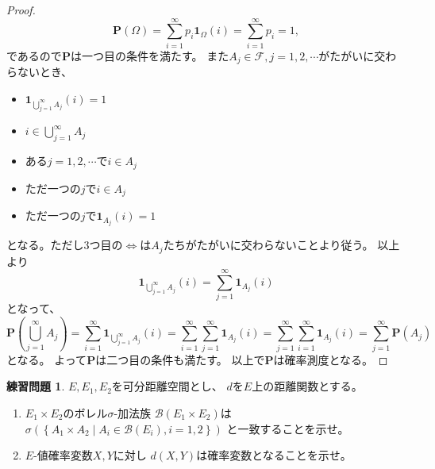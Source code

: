 \documentclass[uplatex]{jsarticle}
\theoremstyle{definition}
\newtheorem{prob}[prob]{練習問題}
\def\P{\mathbf{P}}
\def\I{\mathbf{1}}
\def\mcB{\mathcal{B}}
\def\mcF{\mathcal{F}}
\begin{document}
\begin{proof}
  \[
  \P(\Omega) = \sum_{i=1}^\infty p_i\I_{\Omega}(i) = \sum_{i=1}^\infty p_i = 1,
  \]
  であるので\(\P\)は一つ目の条件を満たす。
  また\(A_j\in\mcF, j = 1,2,\cdots \)がたがいに交わらないとき、
  \begin{itemize}
    \item[ \ ]
    \(\I_{\bigcup_{j=1}^\infty A_j}(i) = 1\)
    \item[\(\iff\)]
    \(i\in \bigcup_{j=1}^\infty A_j\)
    \item[\(\iff\)]
    ある\(j=1,2,\cdots\)で\(i\in A_j\)
    \item[\(\iff\)]
    ただ一つの\(j\)で\(i\in A_j\)
    \item[\(\iff\)]
    ただ一つの\(j\)で\(\I_{A_j}(i)=1\)
  \end{itemize}
  となる。ただし3つ目の\(\iff\)は\(A_j\)たちがたがいに交わらないことより従う。
  以上より
  \[
  \I_{\bigcup_{j=1}^\infty A_j}(i) = \sum_{j=1}^\infty \I_{A_j}(i)
  \]
  となって、
  \[
  \P(\bigcup_{j=1}^\infty A_j)
  = \sum_{i=1}^\infty \I_{\bigcup_{j=1}^\infty A_j}(i)
  = \sum_{i=1}^\infty \sum_{j=1}^\infty \I_{A_j}(i)
  = \sum_{j=1}^\infty \sum_{i=1}^\infty \I_{A_j}(i)
  = \sum_{j=1}^\infty \P(A_j)
  \]
  となる。
  よって\(\P\)は二つ目の条件も満たす。
  以上で\(\P\)は確率測度となる。
\end{proof}






\begin{prob}\label{prob: 1.3}
  \(E,E_1,E_2\)を可分距離空間とし、
  \(d\)を\(E\)上の距離関数とする。
  \begin{enumerate}
    \item \label{enumi: 1.3-1}
    \(E_1\times E_2\)のボレル\(\sigma\)-加法族
    \(\mcB(E_1\times E_2)\)は
    \(\sigma\left(\left\{ A_1\times A_2
    \middle| A_i\in \mcB(E_i),i=1,2\right\} \right)\)
    と一致することを示せ。
    \item \label{enumi: 1.3-2}
    \(E\)-値確率変数\(X,Y\)に対し
    \(d(X,Y)\)は確率変数となることを示せ。
  \end{enumerate}
\end{prob}
\end{document}
